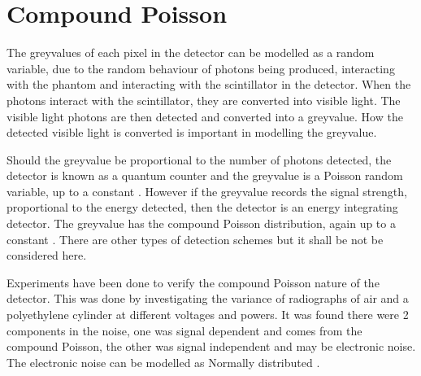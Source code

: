 \section{Compound Poisson}

The greyvalues of each pixel in the detector can be modelled as a random variable, due to the random behaviour of photons being produced, interacting with the phantom and interacting with the scintillator in the detector. When the photons interact with the scintillator, they are converted into visible light. The visible light photons are then detected and converted into a greyvalue. How the detected visible light is converted is important in modelling the greyvalue.

Should the greyvalue be proportional to the number of photons detected, the detector is known as a quantum counter and the greyvalue is a Poisson random variable, up to a constant \citep{whiting2006properties}. However if the greyvalue records the signal strength, proportional to the energy detected, then the detector is an energy integrating detector. The greyvalue has the compound Poisson distribution, again up to a constant \citep{whiting2006properties}. There are other types of detection schemes \citep{whiting2006properties} but it shall be not be considered here.

Experiments have been done to verify the compound Poisson nature of the detector. This was done by investigating the variance of radiographs of air \citep{hsieh2015compound} and a polyethylene cylinder \citep{yang2009evaluation} \citep{yang2010noise} at different voltages and powers. It was found there were 2 components in the noise, one was signal dependent and comes from the compound Poisson, the other was signal independent and may be electronic noise. The electronic noise can be modelled as Normally distributed \citep{xu2009electronic}.

